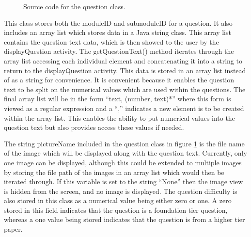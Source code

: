 \documentclass{article}
\begin{document}
\begin{figure}[H]
	\centering
	\caption{Source code for the question class.}
	\label{figure:questionClass}
\end{figure}

This class stores both the moduleID and submoduleID for a question. It also includes an array list which stores data in a Java string class. This array list contains the question text data, which is then showed to the user by the displayQuestion activity. The getQuestionText() method iterates through the array list accessing each individual element and concatenating it into a string to return to the displayQuestion activity. This data is stored in an array list instead of as a string for convenience. It is convenient because it enables the question text to be split on the numerical values which are used within the questions. The final array list will be in the form ``text, (number, text)*'' where this form is viewed as a regular expression and a ``,'' indicates a new element is to be created within the array list. This enables the ability to put numerical values into the question text but also provides access these values if needed. \par

The string pictureName included in the question class in figure \ref{figure:questionClass} is the file name of the image which will be displayed along with the question text. Currently, only one image can be displayed, although this could be extended to multiple images by storing the file path of the images in an array list which would then be iterated through. If this variable is set to the string ``None'' then the image view is hidden from the screen, and no image is displayed. The question difficulty is also stored in this class as a numerical value being either zero or one. A zero stored in this field indicates that the question is a foundation tier question, whereas a one value being stored indicates that the question is from a higher tier paper. \par
\end{document}
